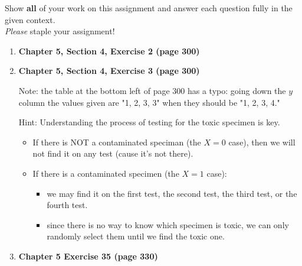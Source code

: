 \documentclass[11pt]{article}
\newcommand{\ben}{\begin{enumerate}}
\newcommand{\een}{\end{enumerate}}
\begin{document}
\pagestyle{fancy} 

Show \textbf{all} of your work on this assignment and answer each question fully in the given context. \\

\emph{Please} staple your assignment! \\

\ben


\item \textbf{Chapter 5, Section 4, Exercise 2 (page 300)}

\item \textbf{Chapter 5, Section 4, Exercise 3 (page 300)}

   Note: the table at the bottom left of page 300 has a typo: going down the $y$ column the values given are "1, 2, 3, 3" when they should be "1, 2, 3, 4."

   Hint: Understanding the process of testing for the toxic specimen is key.
   \begin{itemize}
      \item If there is NOT a contaminated speciman (the $X = 0$ case), then we will not find it on any test (cause it's not there).
      \item If there is a contaminated specimen (the $X = 1$ case):
         \begin{itemize}
         \item we may find it on the first test, the second test, the third test, or the fourth test.
         \item since there is no way to know which specimen is toxic, we can only randomly select them until we find the toxic one.
         \end{itemize}
   \end{itemize}

\item \textbf{Chapter 5 Exercise 35 (page 330)}

\een
\end{document}

